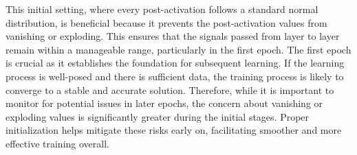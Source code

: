 


This initial setting, where every post-activation follows a standard normal distribution, is beneficial because it prevents the post-activation values from vanishing or exploding. This ensures that the signals passed from layer to layer remain within a manageable range, particularly in the first epoch. The first epoch is crucial as it establishes the foundation for subsequent learning. If the learning process is well-posed and there is sufficient data, the training process is likely to converge to a stable and accurate solution. Therefore, while it is important to monitor for potential issues in later epochs, the concern about vanishing or exploding values is significantly greater during the initial stages. Proper initialization helps mitigate these risks early on, facilitating smoother and more effective training overall.

